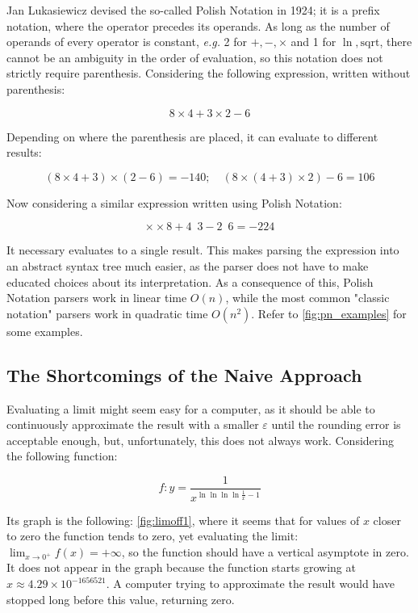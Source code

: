\documentclass{article}
\theoremstyle{plain}
\theoremstyle{definition}
\theoremstyle{algorithm}
\begin{document}
	Jan Lukasiewicz devised the so-called Polish Notation \cite{wiki:polish} in 1924; it is a prefix notation, where the operator precedes its operands.
	As long as the number of operands of every operator is constant, \textit{e.g.} 2 for \(+, -, \times\) and 1 for \(\ln, \text{sqrt}\), there cannot be an ambiguity in the order of evaluation, so this notation does not strictly require parenthesis.
	Considering the following expression, written without parenthesis:
	
	\[
	8 \times 4 + 3 \times  2 - 6
	\]
	
	Depending on where the parenthesis are placed, it can evaluate to different results:
	
	\[
	(8 \times 4 + 3) \times (2 - 6) = -140; \quad (8 \times (4 + 3) \times 2) - 6 = 106 
	\]
	
	Now considering a similar expression written using Polish Notation:
	
	\[
	\times \times 8 + 4 \enspace 3 - 2 \enspace 6 = -224
	\]
	
	It necessary evaluates to a single result.
	This makes parsing the expression into an abstract syntax tree \cite{wiki:abtree} much easier, as the parser does not have to make educated choices about its interpretation. As a consequence of this, Polish Notation parsers work in linear time \(O(n)\), while the most common "classic notation" parsers work in quadratic time \(O(n^{2})\).
	Refer to \cref{fig:pn_examples} for some examples.
	
	
	
	\subsection{The Shortcomings of the Naive Approach}
	
	Evaluating a limit might seem easy for a computer, as it should be able to continuously approximate the result with a smaller $\varepsilon$ until the rounding error is acceptable enough, but, unfortunately, this does not always work.
	Considering the following function:
	
	\[
	f : y = \frac{1}{x^{\ln{\ln{\ln{\ln{\frac{1}{x}}}}}-1}} \tag{1} \label{eq:toinfinity}
	\]
	
	Its graph is the following: \cref{fig:limoff1}, where it seems that for values of \(x\) closer to zero the function tends to zero, yet evaluating the limit: \(\lim_{x \to 0^{+}}{f(x) = +\infty}\), so the function should have a vertical asymptote in zero. It does not appear in the graph because the function starts growing at \(x \approx 4.29 \times 10 ^{-1656521}\). A computer trying to approximate the result would have stopped long before this value, returning zero.
	
\end{document}

